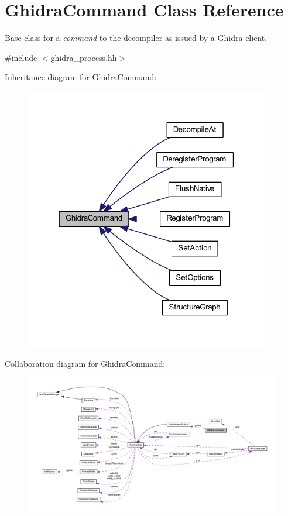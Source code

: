 \hypertarget{class_ghidra_command}{}\section{Ghidra\+Command Class Reference}
\label{class_ghidra_command}


Base class for a {\itshape command} to the decompiler as issued by a Ghidra client.  




{\ttfamily \#include $<$ghidra\+\_\+process.\+hh$>$}



Inheritance diagram for Ghidra\+Command\+:
\nopagebreak
\begin{figure}[H]
\begin{center}
\leavevmode
\includegraphics[width=303pt]{class_ghidra_command__inherit__graph}
\end{center}
\end{figure}


Collaboration diagram for Ghidra\+Command\+:
\nopagebreak
\begin{figure}[H]
\begin{center}
\leavevmode
\includegraphics[width=350pt]{class_ghidra_command__coll__graph}
\end{center}
\end{figure}
